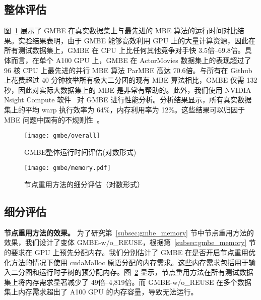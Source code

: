 \subsection{整体评估}

图~\ref{fig:gmbe_exp_overall} 展示了 GMBE 在真实数据集上与最先进的 MBE 算法的运行时间对比结果。实验结果表明，由于 GMBE 能够高效利用 GPU 上的大量计算资源，因此在所有测试数据集上，GMBE 在 CPU 上比任何其他竞争对手快 3.5倍--69.8倍。具体而言，在单个 A100 GPU 上，GMBE 在 ActorMovies 数据集上的表现超过了 96 核 CPU 上最先进的并行 MBE 算法 ParMBE 高达 70.6倍。与所有在 Github 上花费超过 40 分钟枚举所有极大二分团的现有 MBE 算法相比，GMBE 仅需 132 秒，因此对实际大数据集上的 MBE 是非常有帮助的。此外，我们使用 NVIDIA Nsight Compute 软件~\cite{Nsight} 对 GMBE 进行性能分析。分析结果显示，所有真实数据集上的平均 warp 执行效率为 64\%，内存利用率为 12\%。这些结果可以归因于 MBE 问题中固有的不规则性~\cite{Irregularity12}。

\begin{figure} [t]
  \center
		\texttt{[image: gmbe/overall]}
	\caption{GMBE整体运行时间评估(对数形式)}
	\label{fig:gmbe_exp_overall}
\end{figure}


\begin{figure} [t]
	\centering
  \vspace{0.05in}
	\texttt{[image: gmbe/memory.pdf]}	
	\vspace{0.05in}
  \caption{节点重用方法的细分评估（对数形式）}
	\label{fig:gmbe_exp_memory}
\end{figure}




\subsection{细分评估}
\label{subsec:gmbe_breakdown}


\textbf{节点重用方法的效果。} 为了研究第~\ref{subsec:gmbe_memory} 节中节点重用方法的效果，我们设计了变体 GMBE-w/o\_REUSE，根据第~\ref{subsec:gmbe_memory} 节的要求在 GPU 上预先分配内存。我们分别估计了 GMBE 在是否开启节点重用优化方法的情况下使用 \textsf{cudaMalloc} 原语分配的内存需求。这些内存需求包括用于输入二分图和运行时子树的预分配内存。图~\ref{fig:gmbe_exp_memory} 显示，节点重用方法在所有测试数据集上将内存需求显著减少了 49倍--4,819倍。而 GMBE-w/o\_REUSE 在多个数据集上内存需求超出了 A100 GPU 的内存容量，导致无法运行。




